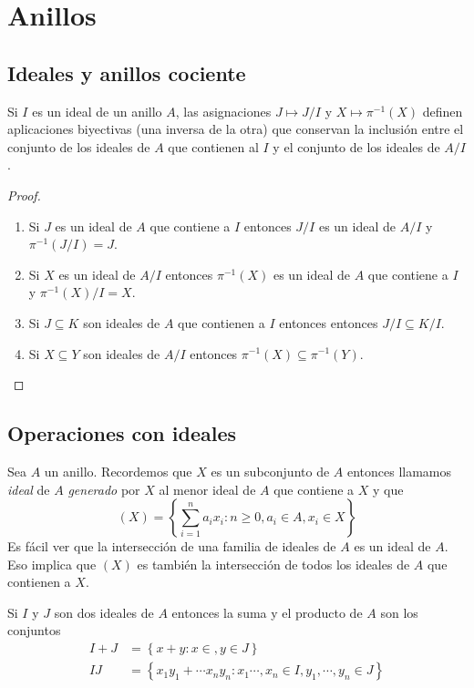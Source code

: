 \chapter{Anillos}
\section{Ideales y anillos cociente}

\begin{teo} Si $I$ es un ideal de un anillo $A$, las asignaciones $J\mapsto J/I$ y $X\mapsto\pi^{-1}(X)$ definen aplicaciones biyectivas (una inversa de la otra) que conservan la inclusión entre el conjunto de los ideales de $A$ que contienen al $I$ y el conjunto de los ideales de $A/I$.
\end{teo}

\begin{proof} \
    \begin{enumerate}[label=(\arabic*)]
        \item Si $J$ es un ideal de $A$ que contiene a $I$ entonces $J/I$ es un ideal de $A/I$ y $\pi^{-1}(J/I)=J$.
        \item Si $X$ es un ideal de $A/I$ entonces $\pi^{-1}(X)$ es un ideal de $A$ que contiene a $I$ y $\pi^{-1}(X)/I=X$.
        \item Si $J\subseteq K$ son ideales de $A$ que contienen a $I$ entonces entonces $J/I\subseteq K/I$.
        \item Si $X\subseteq Y$ son ideales de $A/I$ entonces $\pi^{-1}(X)\subseteq\pi^{-1}(Y)$.
    \end{enumerate}
\end{proof}

\section{Operaciones con ideales}

Sea $A$ un anillo. Recordemos que $X$ es un subconjunto de $A$ entonces llamamos {\it ideal} de $A$ {\it generado} por $X$ al menor ideal de $A$ que contiene a $X$ y que 
$$(X) =\left\lbrace \sum_{i=1}^na_ix_i : n\geq 0, a_i\in A, x_i\in X \right\rbrace$$
Es fácil ver que la intersección de una familia de ideales de $A$ es un ideal de $A$. Eso implica que $(X)$ es también la intersección de todos los ideales de $A$ que contienen a $X$.

Si $I$ y $J$ son dos ideales de $A$ entonces la suma y el producto de $A$ son los conjuntos
\begin{equation*}
    \begin{split}
        I + J &= \left\lbrace x+y : x\in, y\in J \right\rbrace \\
        IJ    &= \left\lbrace x_1y_1 + \cdots x_ny_n : x_1\cdots,x_n\in I, y_1,\cdots,y_n\in J \right\rbrace
    \end{split}
\end{equation*}

